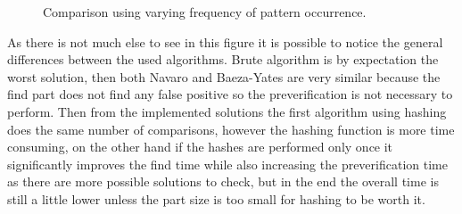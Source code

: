 \begin{figure}[h]
\begin{minipage}{.5\linewidth}
\centering
{}
\end{minipage}%
\begin{minipage}{.5\linewidth}
\centering
{}
\end{minipage}\par\medskip

\caption{Comparison using varying frequency of pattern occurrence.}
\label{fig_patRes}
\end{figure}

As there is not much else to see in this figure it is possible to notice the general differences between the used algorithms. Brute algorithm is by expectation the worst solution, then both Navaro and Baeza-Yates are very similar because the find part does not find any false positive so the preverification is not necessary to perform. Then from the implemented solutions the first algorithm using hashing does the same number of comparisons, however the hashing function is more time consuming, on the other hand if the hashes are performed only once it significantly improves the find time while also increasing the preverification time as there are more possible solutions to check, but in the end the overall time is still a little lower unless the part size is too small for hashing to be worth it.

